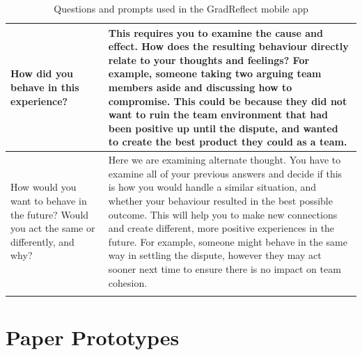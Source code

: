 \documentclass{l4proj}
\begin{document}
\begin{appendices}
\begin{center}
\begin{longtable}{ | m{8em} | m{10cm}| }
    \hline
    How did you behave in this experience? & This requires you to examine the cause and effect.  How does the resulting behaviour directly relate to your thoughts and feelings? For example, someone taking two arguing team members aside and discussing how to compromise. This could be because they did not want to ruin the team environment that had been positive up until the dispute, and wanted to create the best product they could as a team. \\
    \hline
    How would you want to behave in the future? Would you act the same or differently, and why? & Here we are examining alternate thought. You have to examine all of your previous answers and decide if this is how you would handle a similar situation, and whether your behaviour resulted in the best possible outcome. This will help you to make new connections and create different, more positive experiences in the future. For example, someone might behave in the same way in settling the dispute, however they may act sooner next time to ensure there is no impact on team cohesion. \\ [1ex] 
    \hline
    \caption{Questions and prompts used in the GradReflect mobile app} 
    \label{tab:CBTQuestionsPromptsTable}
   \end{longtable}
\end{center}



%

\section{Paper Prototypes} \label{Appendix-PaperPrototypes}


\end{appendices}
\end{document}

